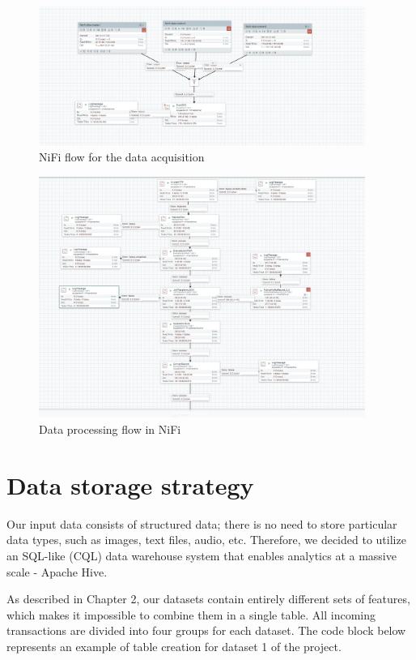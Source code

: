 \documentclass[12pt,a4paper, hidelinks]{article}
\begin{document}
\begin{figure}[h!]
    \centering
    \includegraphics[width=0.95\textwidth]{images/m3-nifi-main-view.png}
    \caption{NiFi flow for the data acquisition}
    \label{fig:nifi1}
\end{figure}
\begin{figure}[h!]
    \centering
    \includegraphics[width=0.95\textwidth]{images/m3-nifi-processor.png}
    \caption{Data processing flow in NiFi}
    \label{fig:nifi2}
\end{figure}
\section{Data storage strategy}

Our input data consists of structured data; there is no need to store particular data types, such as images, text files, audio, etc. Therefore, we decided to utilize an SQL-like (CQL) data warehouse system that enables analytics at a massive scale - Apache Hive.

As described in Chapter 2, our datasets contain entirely different sets of features, which makes it impossible to combine them in a single table. All incoming transactions are divided into four groups for each dataset. The code block below represents an example of table creation for dataset 1 of the project.
\end{document}

